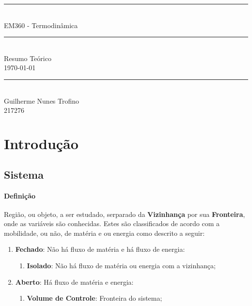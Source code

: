 \documentclass{article}
\begin{document}
\begin{titlepage}
    \begin{center}
        \rule{450pt}{0.5pt}\\[4mm]
        {\Huge EM360 - Termodinâmica}\\
        \rule{450pt}{0.5pt}\\[2mm]
        {\Large Resumo Teórico}\\[200mm]
        \today\\
        \rule{250pt}{0.5pt}\\
        {\large Guilherme Nunes Trofino}\\
        {\large 217276}\\
    \end{center}
\end{titlepage}
\newpage

        \tableofcontents
    \newpage

    \section{Introdução}
        \subsection{Sistema}
            \paragraph{Definição}Região, ou objeto, a ser estudado, serparado da \textbf{Vizinhança} por sua \textbf{Fronteira}, onde as variáveis são conhecidas. Estes são classificados de acordo com a mobilidade, ou não, de matéria e ou energia como descrito a seguir:
                \begin{enumerate}[noitemsep]
                    \item \textbf{Fechado}: Não há fluxo de matéria e há fluxo de energia:
                        \begin{enumerate}[noitemsep]
                            \item \textbf{Isolado}: Não há fluxo de matéria ou energia com a vizinhança;
                        \end{enumerate}
                    \item \textbf{Aberto}: Há fluxo de matéria e energia:
                        \begin{enumerate}[noitemsep]
                            \item \textbf{Volume de Controle}: Fronteira do sistema;
                        \end{enumerate}
                \end{enumerate}
\end{document}
